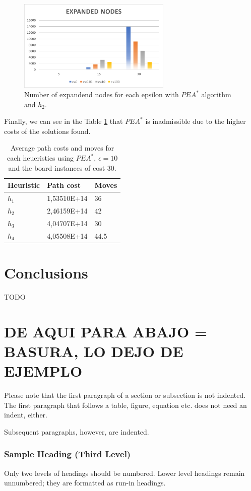 \documentclass[runningheads]{llncs}
\begin{document}
\begin{figure}
    \centering
    \includegraphics[width=0.65\textwidth]{expanded_nodes_PEA.png}
\caption{Number of expandend nodes for each epsilon with $PEA^*$ algorithm and $h_2$.} \label{fig5}
\end{figure}

Finally, we can see in the Table \ref{tab5} that $PEA^*$ is inadmissible due to the higher costs of the solutions found.
\begin{table}
    \centering
    \caption{Average path costs and moves for each heueristics using $PEA^*$, $\epsilon=10$ and the board instances of cost 30.}\label{tab5}
    \begin{tabular}{|l|l|l|}
    \hline
    Heuristic & Path cost & Moves\\
    \hline
    $h_1$ & 1,53510E+14    & 36\\
    $h_2$ & 2,46159E+14    & 42\\
    $h_3$ & 4,04707E+14    & 30\\
    $h_4$ & 4,05508E+14    & 44.5\\
    \hline
    \end{tabular}
\end{table}

\section{Conclusions}
TODO

\section{DE AQUI PARA ABAJO = BASURA, LO DEJO DE EJEMPLO}
Please note that the first paragraph of a section or subsection is
not indented. The first paragraph that follows a table, figure,
equation etc. does not need an indent, either.

Subsequent paragraphs, however, are indented.

\subsubsection{Sample Heading (Third Level)} Only two levels of
headings should be numbered. Lower level headings remain unnumbered;
they are formatted as run-in headings.
\end{document}
